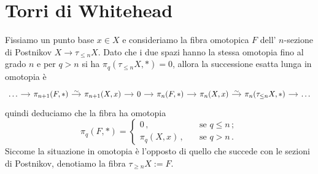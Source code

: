 
%
%
%
%

\section{Torri di Whitehead}

Fissiamo un punto base $x \in X$ e consideriamo la fibra omotopica $F$
dell' $n$-sezione di Postnikov $X \to \tau_{\le n} X$.
Dato che i due spazi hanno la stessa omotopia fino al
grado $n$ e per $q > n$ si ha $\pi_{q}(\tau_{\le n} X,\ast) = 0$,
allora la successione esatta lunga in omotopia è
\begin{equation*}
	\begin{tikzcd}[column sep=small]
		\dots \ar[r] & \pi_{n+1}(F,\ast) \ar[r, "\sim"]
		& \pi_{n+1}(X,x) \ar[r]
		& 0 \ar[r]
		& \pi_{n}(F,\ast) \ar[r]
		& \pi_{n}(X,x) \ar[r, "\sim"]
		& \pi_{n}(\tau_{\le n} X,\ast) \ar[r]
		& \dots
	\end{tikzcd}
\end{equation*}
quindi deduciamo che la fibra ha omotopia
\begin{equation*}
	\pi_{q}(F,\ast) =
	\begin{cases}
		0\,, \quad & \text{se } q \le n\,; \\
		\pi_{q}(X,x)\,, \quad & \text{se } q > n\,.
	\end{cases}
\end{equation*}
Siccome la situazione in omotopia è l'opposto di quello che succede
con le sezioni di Postnikov, denotiamo la fibra $\tau_{\ge n} X := F$.

